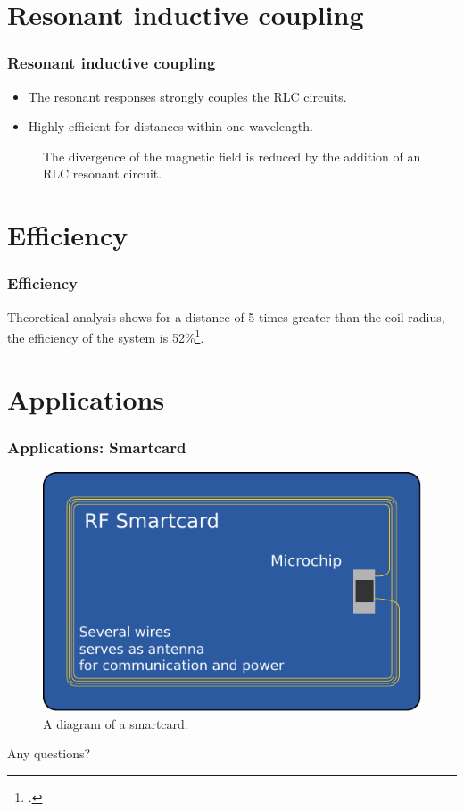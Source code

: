 \documentclass{beamer}
\begin{document}
\section{Resonant inductive coupling}
\begin{frame}
  \frametitle{Resonant inductive coupling}
  \begin{itemize}
    \item The resonant responses strongly couples the RLC circuits.
    \item Highly efficient for distances within one wavelength.
  \end{itemize}
  \begin{figure}
    
    \caption{The divergence of the magnetic field is reduced by the addition
    of an RLC resonant circuit.}
  \end{figure}
\end{frame}

\section{Efficiency}
\begin{frame}
  \frametitle{Efficiency}
  Theoretical analysis shows for a distance of 5 times greater than the coil radius,
  the efficiency of the system is 52\%\footcite{Efficient}.
\end{frame}

\section{Applications}
\begin{frame}
  \frametitle{Applications: Smartcard}
  \begin{figure}
    \includegraphics[scale=0.75]{images/smartcard.pdf}
    \caption{A diagram of a smartcard. \textcite{wikiRIC}}
  \end{figure}
\end{frame}
\begin{frame}
  \center
  \begin{block}{Any questions?}
  \end{block}
\end{frame}
\end{document}
